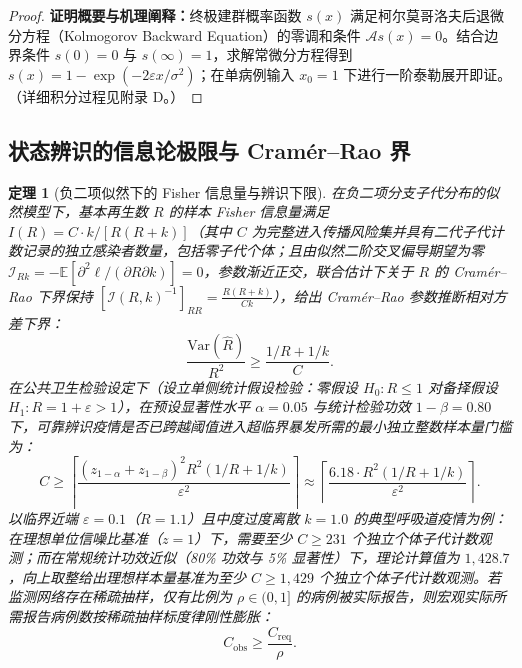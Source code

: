 \documentclass[11pt,a4paper]{article}
\theoremstyle{plain}
\newtheorem{theorem}{定理}
\theoremstyle{definition}
\begin{document}
\begin{proof}
\textbf{证明概要与机理阐释：}终极建群概率函数 $s(x)$ 满足柯尔莫哥洛夫后退微分方程（Kolmogorov Backward Equation）的零调和条件 $\mathcal{A} s(x) = 0$。结合边界条件 $s(0) = 0$ 与 $s(\infty) = 1$，求解常微分方程得到 $s(x) = 1 - \exp(-2\varepsilon x / \sigma^2)$；在单病例输入 $x_0 = 1$ 下进行一阶泰勒展开即证。（详细积分过程见附录 D。）
\end{proof}

\subsection{状态辨识的信息论极限与 Cram\'er--Rao 界}

\begin{theorem}[负二项似然下的 Fisher 信息量与辨识下限]\label{thm:fisher}
在负二项分支子代分布的似然模型下，基本再生数 $R$ 的样本 Fisher 信息量满足 $I(R) = C \cdot k / [R(R+k)]$（其中 $C$ 为完整进入传播风险集并具有二代子代计数记录的独立感染者数量，包括零子代个体；且由似然二阶交叉偏导期望为零 $\mathcal{I}_{Rk} = -\mathbb{E}[\partial^2 \ell / (\partial R \partial k)] = 0$，参数渐近正交，联合估计下关于 $R$ 的 Cram\'er--Rao 下界保持 $[\mathcal{I}(R,k)^{-1}]_{RR} = \frac{R(R+k)}{Ck}$），给出 Cram\'er--Rao 参数推断相对方差下界：
\begin{equation}
\frac{\text{Var}(\hat{R})}{R^2} \ge \frac{1/R + 1/k}{C}.
\label{eq:cramer_cn}
\end{equation}
在公共卫生检验设定下（设立单侧统计假设检验：零假设 $H_0: R \le 1$ 对备择假设 $H_1: R = 1 + \varepsilon > 1$），在预设显著性水平 $\alpha = 0.05$ 与统计检验功效 $1 - \beta = 0.80$ 下，可靠辨识疫情是否已跨越阈值进入超临界暴发所需的最小独立整数样本量门槛为：
\begin{equation}
C \ge \left\lceil \frac{(z_{1-\alpha} + z_{1-\beta})^2 R^2 (1/R + 1/k)}{\varepsilon^2} \right\rceil \approx \left\lceil \frac{6.18 \cdot R^2 (1/R + 1/k)}{\varepsilon^2} \right\rceil.
\end{equation}
以临界近端 $\varepsilon = 0.1$（$R = 1.1$）且中度过度离散 $k = 1.0$ 的典型呼吸道疫情为例：在理想单位信噪比基准（$z=1$）下，需要至少 $C \ge 231$ 个独立个体子代计数观测；而在常规统计功效近似（80\% 功效与 5\% 显著性）下，理论计算值为 $1{,}428.7$，向上取整给出理想样本量基准为至少 $C \ge 1{,}429$ 个独立个体子代计数观测。若监测网络存在稀疏抽样，仅有比例为 $\rho \in (0, 1]$ 的病例被实际报告，则宏观实际所需报告病例数按稀疏抽样标度律刚性膨胀：
\begin{equation}
C_{\text{obs}} \ge \frac{C_{\text{req}}}{\rho}.
\label{eq:sparse_sampling}
\end{equation}
\end{theorem}
\end{document}
